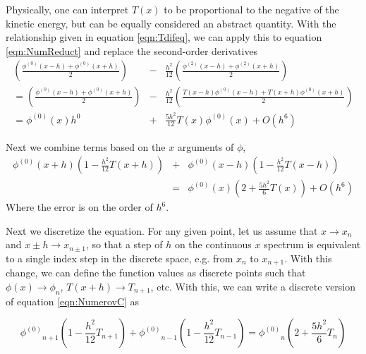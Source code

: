 \documentclass[preprint]{revtex4}
\newcommand{\phid}[1]{\ensuremath{\phi^{(#1)}}}
\begin{document}
Physically, one can interpret $T(x)$ to be proportional to the negative of the kinetic energy, but can be equally considered an abstract quantity. 
With the relationship given in equation \ref{eqn:Tdifeq}, we can apply this to equation \ref{eqn:NumReduct} and replace the second-order derivatives
\begin{eqnarray}
    \left(\frac{\phid{0}(x-h) + \phid{0}(x+h)}{2}\right)  &-& \frac{h^2}{12}\left(\frac{\phid{2}(x-h) + \phid{2}(x+h)}{2}\right)  \nonumber \\
    =\left(\frac{\phid{0}(x-h) + \phid{0}(x+h)}{2}\right)  &-& \frac{h^2}{12}\left(\frac{T(x-h)\phid{0}(x-h) + T(x+h)\phid{0}(x+h)}{2}\right)  \nonumber \\
    = \phid{0}(x)h^0 &+& \frac{5h^2}{12}T(x)\phid{0}(x) + O(h^6) 
\end{eqnarray}

Next we combine terms based on the $x$ arguments of $\phi$, 
\begin{eqnarray}
    \phid{0}(x+h)\left(1-\frac{h^2}{12}T(x+h)\right) &+& \phid{0}(x-h)\left(1-\frac{h^2}{12}T(x-h)\right) \nonumber \\
    &=& \phid{0}(x)\left(2+\frac{5h^2}{6}T(x)\right) + O(h^6) 
    \label{eqn:NumerovC}
\end{eqnarray}
Where the error is on the order of $h^6$. 

Next we discretize the equation. For any given point, let us assume that $x \to x_n$ and $x\pm h \to x_{n\pm 1}$, so that a step of $h$ 
on the continuous $x$ spectrum is equivalent to a single index step in the discrete space, e.g. from $x_n$ to $x_{n+1}$. 
With this change, we can define the function values as discrete points such that $\phi(x) \to \phi_n$, $T(x+h) \to T_{n+1}$, etc. 
With this, we can write a discrete version of equation \ref{eqn:NumerovC} as

\begin{equation}
    \phid{0}_{n+1}\left(1-\frac{h^2}{12}T_{n+1}\right) + \phid{0}_{n-1}\left(1-\frac{h^2}{12}T_{n-1}\right) =  \phid{0}_n\left(2+\frac{5h^2}{6}T_n\right)
\end{equation}
\end{document}
